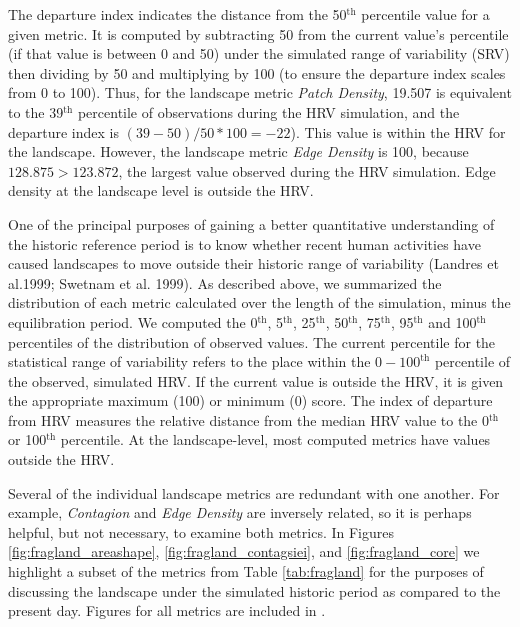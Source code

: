 The departure index indicates the distance from the 50$^{\text{th}}$ percentile value for a given metric. It is computed by subtracting 50 from the current value's percentile (if that value is between 0 and 50) under the simulated range of variability (SRV) then dividing by 50 and multiplying by 100 (to ensure the departure index scales from 0 to 100). Thus, for the landscape metric \emph{Patch Density}, 19.507 is equivalent to the 39$^{\text{th}}$ percentile of observations during the HRV simulation, and the departure index is $(39-50)/50*100 = -22$). This value is within the HRV for the landscape. However, the landscape metric \emph{Edge Density} is 100, because $128.875 > 123.872$, the largest value observed during the HRV simulation. Edge density at the landscape level is outside the HRV.

One of the principal purposes of gaining a better quantitative understanding of the historic reference period is to know whether recent human activities have caused landscapes to move outside their historic range of variability (Landres et al.1999; Swetnam et al. 1999). As described above, we summarized the distribution of each metric calculated over the length of the simulation, minus the equilibration period. We computed the 0$^{\text{th}}$, 5$^{\text{th}}$, 25$^{\text{th}}$, 50$^{\text{th}}$, 75$^{\text{th}}$, 95$^{\text{th}}$ and 100$^{\text{th}}$ percentiles of the distribution of observed values. The current percentile for the statistical range of variability refers to the place within the $0-100^{\text{th}}$ percentile of the observed, simulated HRV. If the current value is outside the HRV, it is given the appropriate maximum (100) or minimum (0) score. The index of departure from HRV measures the relative distance from the median HRV value to the 0$^{\text{th}}$ or 100$^{\text{th}}$ percentile. At the landscape-level, most computed metrics have values outside the HRV. 

Several of the individual landscape metrics are redundant with one another. For example, \emph{Contagion} and \emph{Edge Density} are inversely related, so it is perhaps helpful, but not necessary, to examine both metrics. In Figures \ref{fig:fragland_areashape}, \ref{fig:fragland_contagsiei}, and \ref{fig:fragland_core} we highlight a subset of the metrics from Table \ref{tab:fragland} for the purposes of discussing the landscape under the simulated historic period as compared to the present day. Figures for all metrics are included in .


